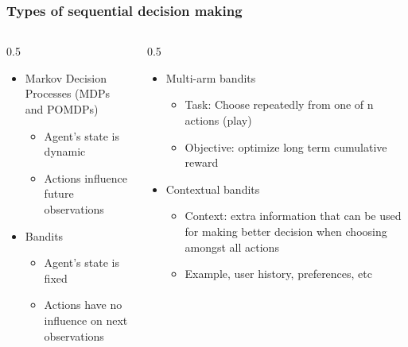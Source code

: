 \begin{frame}[fragile]\frametitle{Types of sequential decision making}

\begin{columns}
\begin{column}{0.5\textwidth}

\begin{itemize}
\item Markov Decision Processes (MDPs and POMDPs)
	\begin{itemize}
	\item Agent's state is dynamic
	\item Actions influence future observations
	\end{itemize}
\item Bandits
	\begin{itemize}
	\item Agent's state is fixed
	\item Actions have no influence on next observations
	\end{itemize}
\end{itemize}

\end{column}
\begin{column}{0.5\textwidth}  %

\begin{itemize}
\item Multi-arm bandits	
	\begin{itemize}
	\item Task: Choose repeatedly from one of n actions (play)
	\item Objective: optimize long term cumulative reward
	\end{itemize}
\item Contextual bandits	
	\begin{itemize}
	\item Context: extra information that can be used for making better decision when choosing amongst all actions
	\item Example, user history, preferences, etc
	\end{itemize}	
\end{itemize}

\end{column}
\end{columns}




\end{frame}

